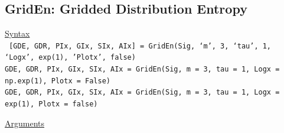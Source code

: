 \documentclass[12pt, a4paper, titlepage, openany]{book}
\begin{document}
\newpage
\subsection{\normalsize GridEn: \hspace{15mm} Gridded Distribution Entropy}\label{GridEn}
\noindent\ul{Syntax} \vspace{6mm} \\ \noindent \texttt{\footnotesize
[GDE, GDR, PIx, GIx, SIx, AIx]  = GridEn(Sig, ‘m’, 3, ‘tau’, 1, ‘Logx’, exp(1), 'Plotx', false) \\
GDE, GDR, PIx, GIx, SIx, AIx = GridEn(Sig, m = 3, tau = 1, Logx = np.exp(1), Plotx = False) \\
GDE, GDR, PIx, GIx, SIx, AIx = GridEn(Sig, m = 3, tau = 1, Logx = exp(1), Plotx = false)}

\noindent \ul{Arguments}
\end{document}
